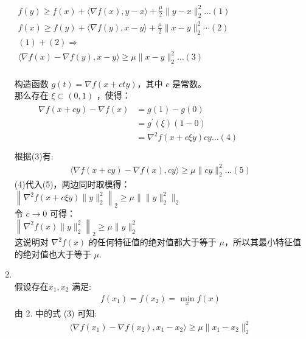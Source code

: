 \documentclass[11pt,letter,notitlepage]{article}
\begin{document}
\begin{solution}
\begin{enumerate}
        $\begin{array}{l}{f(y) \geq f(x)+\langle\nabla f(x), y-x\rangle+\frac{\mu}{2}\|y-x\|_{2}^{2} \ldots (1)} \\ {f(x) \geq f(y)+\langle\nabla f(y), x-y\rangle+\frac{\mu}{2}\|x-y\|_{2}^{2} \cdots (2)} \\ {(1)+(2) \Rightarrow} \\ {\langle\nabla f(x)-\nabla f(y), x-y\rangle \geqslant \mu\|x-y\|_{2}^{2} \ldots (3)}\end{array}$\\ \ \\
        构造函数 $g(t)= \nabla f(x+c t y)$，其中 $c$ 是常数。\\
        那么存在 $\xi \subset (0,1)$ ，使得：\\
        $\begin{array}{l}{\qquad \begin{aligned}  \nabla f(x+c y)-\nabla f(x) &=g(1)-g(0) \\ &=g^{\prime}\left(\xi \right)(1-0) \\ &=\nabla^{2} f(x+c\xi y)c y \ldots (4)\end{aligned}} \\  \end{array}$\\
        根据(3)有:
        \begin{align*}
            \langle\nabla f(x + cy)-\nabla f(x), cy\rangle \geqslant \mu\|cy\|_{2}^{2} \ldots (5)
        \end{align*}
        (4)代入(5)，两边同时取模得：\\
        $ \left\|\nabla^{2} f(x+c \xi y) \|y\|_{2}^{2}\right\|_2 \geq \mu \| \|y \|_{2}^{2} \|_2$\\
        令 $c \rightarrow 0$ 可得：\\
        $ \left\|\nabla^{2} f(x) \|y\|_{2}^{2}\right\|_2 \geq \mu\|y\|_{2}^{2}$\\
        这说明对 $\nabla^{2}f(x)$ 的任何特征值的绝对值都大于等于 $\mu$，所以其最小特征值的绝对值也大于等于 $\mu$.
        \item \ \\
        假设存在$x_1, x_2$ 满足:\\
        \begin{align*}
            f(x_1) = f(x_2) = \min_{x}f(x)
        \end{align*}
        由 2. 中的式 (3) 可知:\\
        \begin{align*}
            \langle\nabla f(x_1)-\nabla f(x_2), x_1-x_2\rangle \geqslant \mu\|x_1-x_2\|_{2}^{2}

\end{align*}
\end{enumerate}
\end{solution}
\end{document}
